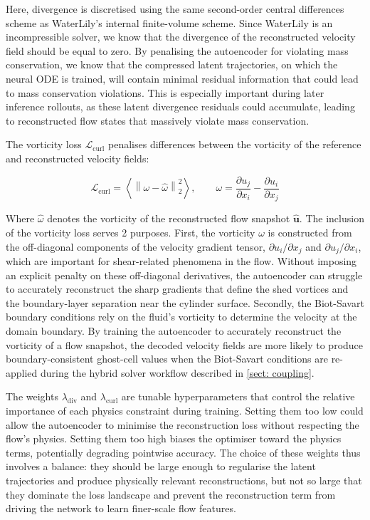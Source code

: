 Here, divergence is discretised using the same second-order central differences scheme as WaterLily's internal finite-volume scheme. Since WaterLily is an incompressible solver, we know that the divergence of the reconstructed velocity field should be equal to zero. By penalising the autoencoder for violating mass conservation, we know that the compressed latent trajectories, on which the neural ODE is trained, will contain minimal residual information that could lead to mass conservation violations. This is especially important during later inference rollouts, as these latent divergence residuals could accumulate, leading to reconstructed flow states that massively violate mass conservation.

The vorticity loss $\mathcal{L}_\text{curl}$ penalises differences between the vorticity of the reference and reconstructed velocity fields:

\begin{equation}\label{eq: curl_loss}
    \mathcal{L}_\text{curl}
    = \left\langle
        \left\| \omega - \hat{\omega} \right\|_2^2
      \right\rangle,
    \qquad
    \omega = \frac{\partial u_j}{\partial x_i} - \frac{\partial u_i}{\partial x_j}
\end{equation}

Where $\hat{\omega}$ denotes the vorticity of the reconstructed flow snapshot $\mathbf{\hat{u}}$. The inclusion of the vorticity loss serves 2 purposes. First, the vorticity $\omega$ is constructed from the off-diagonal components of the velocity gradient tensor, $\partial u_i / \partial x_j$ and $\partial u_j / \partial x_i$, which are important for shear-related phenomena in the flow. Without imposing an explicit penalty on these off-diagonal derivatives, the autoencoder can struggle to accurately reconstruct the sharp gradients that define the shed vortices and the boundary-layer separation near the cylinder surface. Secondly, the Biot-Savart boundary conditions rely on the fluid's vorticity to determine the velocity at the domain boundary. By training the autoencoder to accurately reconstruct the vorticity of a flow snapshot, the decoded velocity fields are more likely to produce boundary-consistent ghost-cell values when the Biot-Savart conditions are re-applied during the hybrid solver workflow described in \autoref{sect: coupling}. 

The weights $\lambda_\text{div}$ and $\lambda_\text{curl}$ are tunable hyperparameters that control the relative importance of each physics constraint during training. Setting them too low could allow the autoencoder to minimise the reconstruction loss without respecting the flow's physics. Setting them too high biases the optimiser toward the physics terms, potentially degrading pointwise accuracy. The choice of these weights thus involves a balance: they should be large enough to regularise the latent trajectories and produce physically relevant reconstructions, but not so large that they dominate the loss landscape and prevent the reconstruction term from driving the network to learn finer-scale flow features.  


